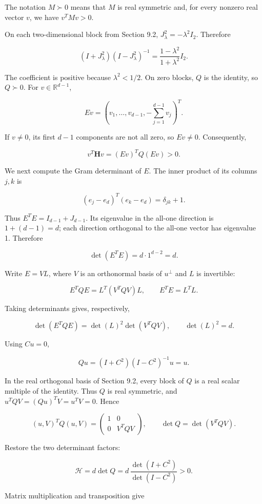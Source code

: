 \documentclass[11pt,a4paper]{article}
\begin{document}
The notation \(M\succ0\) means that \(M\) is real symmetric and, for every nonzero real vector \(v\), we have \(v^TMv>0\).

On each two-dimensional block from Section 9.2, \(J_\lambda^2=-\lambda^2I_2\). Therefore

\[
(I+J_\lambda^2)(I-J_\lambda^2)^{-1}
=\frac{1-\lambda^2}{1+\lambda^2}I_2.
\]

The coefficient is positive because \(\lambda^2<1/2\). On zero blocks, \(Q\) is the identity, so \(Q\succ0\). For \(v\in\mathbb R^{d-1}\),

\[
Ev=(v_1,\ldots,v_{d-1},-\textstyle\sum_{j=1}^{d-1}v_j)^T.
\]

If \(v\ne0\), its first \(d-1\) components are not all zero, so \(Ev\ne0\). Consequently,

\[
v^T\mathbf Hv=(Ev)^TQ(Ev)>0.
\]

We next compute the Gram determinant of \(E\). The inner product of its columns \(j,k\) is

\[
(e_j-e_d)^T(e_k-e_d)=\delta_{jk}+1.
\]

Thus \(E^TE=I_{d-1}+J_{d-1}\). Its eigenvalue in the all-one direction is \(1+(d-1)=d\); each direction orthogonal to the all-one vector has eigenvalue 1. Therefore

\[
\det(E^TE)=d\cdot1^{d-2}=d.
\]

Write \(E=VL\), where \(V\) is an orthonormal basis of \(u^\perp\) and \(L\) is invertible:

\[
E^TQE=L^T(V^TQV)L,\qquad
E^TE=L^TL.
\]

Taking determinants gives, respectively,

\[
\det(E^TQE)=\det(L)^2\det(V^TQV),\qquad
\det(L)^2=d.
\]

Using \(Cu=0\),

\[
Qu=(I+C^2)(I-C^2)^{-1}u=u.
\]

In the real orthogonal basis of Section 9.2, every block of \(Q\) is a real scalar multiple of the identity. Thus \(Q\) is real symmetric, and \(u^TQV=(Qu)^TV=u^TV=0\). Hence

\[
(u,V)^TQ(u,V)=
\begin{pmatrix}1&0\\0&V^TQV\end{pmatrix},
\qquad \det Q=\det(V^TQV).
\]

Restore the two determinant factors:

\[
\mathcal H=d\det Q
=d\,\frac{\det(I+C^2)}{\det(I-C^2)}>0.
\]

Matrix multiplication and transposition give
\end{document}
